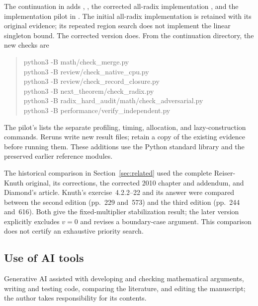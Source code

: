 \documentclass[11pt,reqno]{amsart}
\theoremstyle{definition}
\theoremstyle{remark}
\numberwithin{equation}{section}
\begin{document}
The continuation in  adds
, ,
the corrected all-radix implementation
,
and the implementation pilot in . The initial all-radix
implementation is retained with its original evidence; its repeated region
search does not implement the linear singleton bound. The corrected version
does. From the continuation directory,
the new checks are
\begin{quote}\small\ttfamily
python3 -B math/check\_merge.py\\
python3 -B review/check\_native\_cpu.py\\
python3 -B review/check\_record\_closure.py\\
python3 -B next\_theorem/check\_radix.py\\
python3 -B radix\_hard\_audit/math/check\_adversarial.py\\
python3 -B performance/verify\_independent.py
\end{quote}
The pilot's  lists the separate profiling, timing,
allocation, and lazy-construction commands. Reruns write new result files;
retain a copy of the existing evidence before running them. These additions
use the Python standard library and the preserved earlier reference modules.

The historical comparison in Section~\ref{sec:related} used the complete
Reiser-Knuth original, its corrections, the corrected 2010 chapter and
addendum, and Diamond's article. Knuth's exercise~4.2.2--22 and its answer
were compared between the second edition (pp.~229 and~573) and the third
edition (pp.~244 and~616). Both give the fixed-multiplier stabilization
result; the later version explicitly excludes $v=0$ and revises a
boundary-case argument. This comparison does not certify an exhaustive
priority search.

\begin{samepage}
\section*{Use of AI tools}

Generative AI assisted with developing and checking mathematical arguments,
writing and testing code, comparing the literature, and editing the
manuscript; the author takes responsibility for its contents.
\end{samepage}
\end{document}
